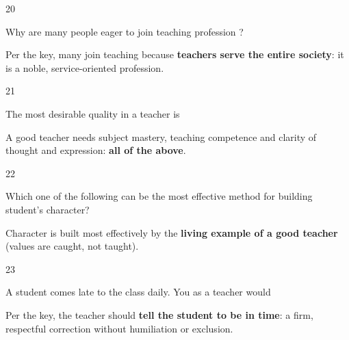\begin{question}{20}
{Why are many people eager to join teaching profession ?\par}
\begin{explain}
Per the key, many join teaching because \textbf{teachers serve the entire society}: it is a noble, service-oriented profession.
\end{explain}
\end{question}

\begin{question}{21}
{The most desirable quality in a teacher is\par}
\begin{explain}
A good teacher needs subject mastery, teaching competence and clarity of thought and expression: \textbf{all of the above}.
\end{explain}
\end{question}

\begin{question}{22}
{Which one of the following can be the most effective method for building student's character?\par}
\begin{explain}
Character is built most effectively by the \textbf{living example of a good teacher} (values are caught, not taught).
\end{explain}
\end{question}

\begin{question}{23}
{A student comes late to the class daily. You as a teacher would\par}
\begin{explain}
Per the key, the teacher should \textbf{tell the student to be in time}: a firm, respectful correction without humiliation or exclusion.
\end{explain}
\end{question}

